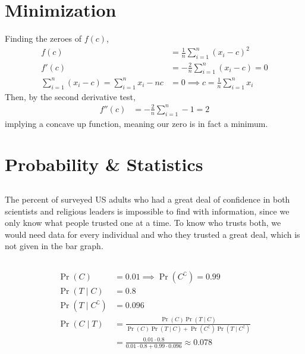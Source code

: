 \documentclass{article}
\begin{document}
\section{Minimization}

Finding the zeroes of \(f(c)\),
\begin{align}
    f(c) &= \frac{1}{n} \sum_{i = 1}^n (x_i - c)^2 \\
    f'(c) &= -\frac{2}{n} \sum_{i = 1}^n (x_i - c) = 0 \\
    \sum_{i = 1}^n (x_i - c) = \sum_{i = 1}^n x_i - nc &= 0 \implies c = \frac{1}{n} \sum_{i = 1}^n x_i
\end{align}
Then, by the second derivative test,
\begin{align}
    f''(c) &= -\frac{2}{n} \sum_{i = 1}^n -1 = 2
\end{align}
implying a concave up function, meaning our zero is in fact a minimum.

\section{Probability \& Statistics}

\subsection{}

The percent of surveyed US adults who had a great deal of confidence in both scientists and religious leaders is impossible to find with information, since we only know what people trusted one at a time.
To know who trusts both, we would need data for every individual and who they trusted a great deal, which is not given in the bar graph.

\subsection{}

\begin{align}
    \Pr(C) &= 0.01 \implies \Pr(C^\complement) = 0.99 \\
    \Pr(T \mid C) &= 0.8 \\
    \Pr(T \mid C^\complement) &= 0.096 \\
    \Pr(C \mid T) &= \frac{\Pr(C) \Pr(T \mid C)}{\Pr(C) \Pr(T \mid C) + \Pr(C^\complement) \Pr(T \mid C^\complement)} \\
    &= \frac{0.01 \cdot 0.8}{0.01 \cdot 0.8 + 0.99 \cdot 0.096} \approx 0.078
\end{align}
\end{document}
